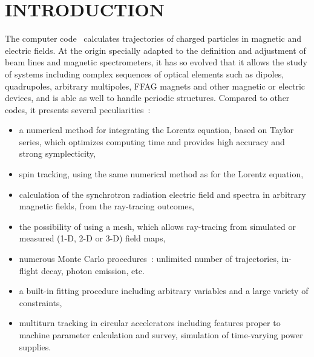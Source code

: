 
      \pagestyle{headings}


\section*{INTRODUCTION} 

The computer code \zgou\  calculates trajectories of
charged particles in magnetic and electric fields.  At the origin specially adapted to the definition and adjustment of 
beam lines and magnetic spectrometers, it has so evolved that it allows the study of systems including complex
 sequences of optical elements such as dipoles, quadrupoles, 
 arbitrary multipoles, FFAG magnets and other magnetic or electric
 devices, and is able as well to handle periodic structures.  Compared to other codes, it presents several peculiarities~: 
\begin{itemize}
\item a numerical method for integrating the Lorentz equation, based on Taylor series,
	which optimizes computing time and provides high accuracy and strong symplecticity,
\item spin tracking, using the same numerical method as for the Lorentz equation,
\item calculation of the synchrotron radiation electric field and 
spectra in arbitrary magnetic fields, from the ray-tracing outcomes,
\item the possibility of using a mesh, which allows ray-tracing from
	simulated or measured (1-D, 2-D or 3-D) field maps, 
\item numerous Monte Carlo procedures~: unlimited number of trajectories, in-flight decay, 
photon emission, etc. 
\item a built-in fitting procedure including arbitrary variables and a large variety of 
constraints, 
\item multiturn tracking in circular accelerators including  features proper to machine 
parameter calculation and survey,  simulation of time-varying power  supplies. 
\end{itemize}

